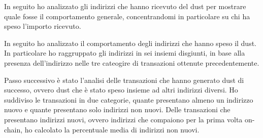 In seguito ho analizzato gli indirizzi che hanno ricevuto del dust per mostrare quale fosse il comportamento generale, concentrandomi in particolare su chi ha speso l'importo ricevuto.

In seguito ho analizzato il comportamento degli indirizzi che hanno speso il dust. In particolare ho raggruppato gli indirizzi in sei insiemi disgiunti, in base alla presenza dell'indirizzo nelle tre cateogire di transazioni ottenute precedentemente.

Passo successivo è stato l'analisi delle transazioni che hanno generato dust di successo, ovvero dust che è stato speso insieme ad altri indirizzi diversi. Ho suddiviso le transazioni in due categorie, quante presentano almeno un indirizzo nuovo e quante presentano solo indirizzi non nuovi. Delle transazioni che presentano indirizzi nuovi, ovvero indirizzi che compaiono per la prima volta on-chain, ho calcolato la percentuale media di indirizzi non nuovi.


